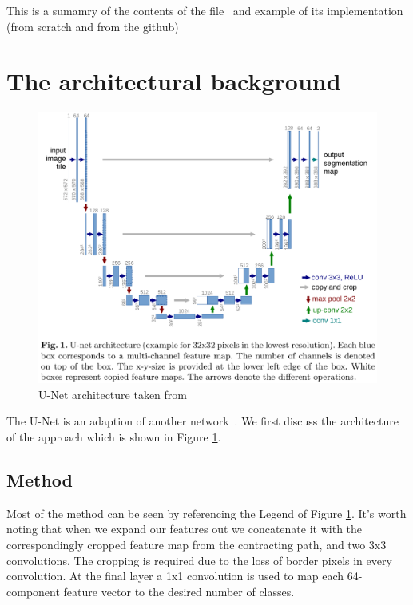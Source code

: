 \documentclass[11pt]{article}
\begin{document}


\tableofcontents

\clearpage

This is a sumamry of the contents of the file~\cite{U-Net} and example of its implementation (from scratch and from the github)

\section{The architectural background} 

\begin{figure}[H]
    \centering
    \includegraphics[width=\linewidth]{images/u-net.png}
    \caption{U-Net architecture taken from~\cite{U-Net}}
    \label{fig:u-net-architecture}
\end{figure}

The U-Net is an adaption of another network~\cite{fully-CNNs-for-semantic-segmentation}. We first discuss the architecture of the approach which is shown in Figure \ref{fig:u-net-architecture}.

\subsection{Method}

Most of the method can be seen by referencing the Legend of Figure \ref{fig:u-net-architecture}. It's worth noting that when we expand our features out we concatenate it with the correspondingly cropped feature map from the contracting path, and two 3x3 convolutions. The cropping is required due to the loss of border pixels in every convolution. At the final layer a 1x1 convolution is used to map each 64-component feature vector to the desired number of classes.
\end{document}
